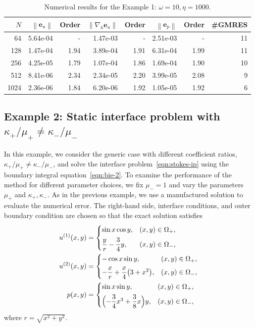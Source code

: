 \documentclass[preprint,11pt]{elsarticle}
\theoremstyle{remark}
\newcommand{\bm}[1]{\boldsymbol{#1}}
\newcommand{\norm}[1]{\left\lVert #1 \right\rVert}
\begin{document}
\begin{table}[htbp]
\centering
\caption{Numerical results for the Example 1: $\omega = 10, \eta = 1000$.}
\label{tab:eg1-5}
\begin{tabular}{r r r r r r r r}
\hline
$N$ & $\norm{\bm e_u}$ & Order & $\norm{\nabla_h \bm e_u}$ & Order & $\norm{\bm e_p}$ & Order & \#GMRES \\
\hline
  64  & 5.64e-04 & - & 1.47e-03 & - & 2.51e-03 & - & 11 \\
 128  & 1.47e-04 & 1.94 & 3.89e-04 & 1.91 & 6.31e-04 & 1.99 & 11 \\
 256  & 4.25e-05 & 1.79 & 1.07e-04 & 1.86 & 1.69e-04 & 1.90 & 10 \\
 512  & 8.41e-06 & 2.34 & 2.34e-05 & 2.20 & 3.99e-05 & 2.08 &  9 \\
1024  & 2.36e-06 & 1.84 & 6.20e-06 & 1.92 & 1.05e-05 & 1.92 &  6 \\
\hline
\end{tabular}
\end{table}


\subsection{Example 2: Static interface problem with $\kappa_+/\mu_+ \neq \kappa_-/\mu_-$}
In this example, we consider the generic case with different coefficient ratios, 
$\kappa_+/\mu_+ \neq \kappa_-/\mu_-$, and solve the interface problem~\eqref{eqn:stokes-ip}
using the boundary integral equation~\eqref{eqn:bie-2}.
To examine the performance of the method for different parameter choices, we fix $\mu_- = 1$
and vary the parameters $\mu_+$ and $\kappa_+, \kappa_-$.
As in the previous example, we use a manufactured solution to evaluate the numerical error.
The right-hand side, interface conditions, and outer boundary condition are chosen so that the
exact solution satisfies
\begin{equation}
\begin{aligned}
    u^{(1)}(x,y) &= 
    \begin{cases}
        \sin x \cos y, & (x,y)\in\Omega_+,\\[4pt]
        \dfrac{y}{r} - \dfrac{3}{4}y, & (x,y)\in\Omega_-,
    \end{cases} \\
    u^{(2)}(x,y) &=
    \begin{cases}
        -\cos x \sin y, & (x,y)\in\Omega_+,\\[4pt]
        -\dfrac{x}{r} + \dfrac{x}{4}\bigl(3 + x^2\bigr), & (x,y)\in\Omega_-,
    \end{cases} \\
    p(x,y) &=
    \begin{cases}
        \sin x \sin y, & (x,y)\in\Omega_+,\\[4pt]
        \Bigl(-\dfrac{3}{4}x^3 + \dfrac{3}{8}x\Bigr)y, & (x,y)\in\Omega_-,
    \end{cases}
\end{aligned}
\end{equation}
where $r = \sqrt{x^2 + y^2}$.
\end{document}
